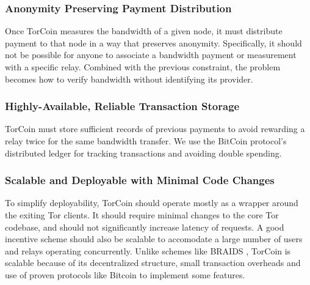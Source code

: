 \subsubsection{Anonymity Preserving Payment Distribution} Once TorCoin measures
the bandwidth of a given node, it must distribute payment to that node in a way
that preserves anonymity. Specifically, it should not be possible for anyone to
associate a bandwidth payment or measurement with a specific relay. Combined
with the previous constraint, the problem becomes how to verify bandwidth
without identifying its provider.

\subsubsection{Highly-Available, Reliable Transaction Storage} TorCoin must store
sufficient records of previous payments to avoid rewarding a relay twice for the
same bandwidth transfer. We use the BitCoin protocol's distributed ledger 
for tracking transactions and avoiding double spending.

\subsubsection{Scalable and Deployable with Minimal Code Changes} To simplify deployability,
TorCoin should operate mostly as a wrapper around the exiting Tor clients. It should
require minimal changes to the core Tor codebase, and should not significantly
increase latency of requests. A good incentive scheme should also be scalable to
accomodate a large number of users and relays operating concurrently. Unlike schemes
like BRAIDS \cite{ccs10-braids}, TorCoin is scalable because of its decentralized 
structure, small transaction overheads and use of proven protocols like Bitcoin 
to implement some features. 





